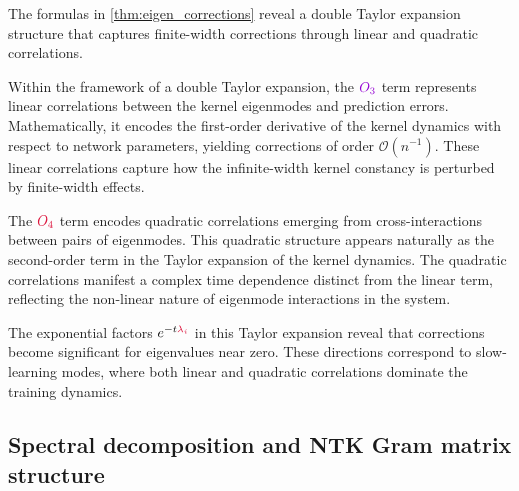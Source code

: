 \documentclass[a4paper]{article}
\theoremstyle{plain}
\theoremstyle{definition}
\theoremstyle{remark}
\begin{document}
\begin{tcolorbox}[colback=green!10,colframe=green!60!black,title={\textbf{Remark: Interpretation of the corrections}},enhanced,drop shadow]
The formulas in \ref{thm:eigen_corrections} reveal a double Taylor expansion structure that captures finite-width corrections through linear and quadratic correlations.

Within the framework of a double Taylor expansion, the $\textcolor{k3color}{O_3}$ term represents linear correlations between the kernel eigenmodes and prediction errors. Mathematically, it encodes the first-order derivative of the kernel dynamics with respect to network parameters, yielding corrections of order $\mathcal{O}(n^{-1})$. These linear correlations capture how the infinite-width kernel constancy is perturbed by finite-width effects.

The $\textcolor{kernelcolor}{O_4}$ term encodes quadratic correlations emerging from cross-interactions between pairs of eigenmodes. This quadratic structure appears naturally as the second-order term in the Taylor expansion of the kernel dynamics. The quadratic correlations manifest a complex time dependence distinct from the linear term, reflecting the non-linear nature of eigenmode interactions in the system.

The exponential factors $e^{-t\textcolor{kernelcolor}{\lambda_i}}$ in this Taylor expansion reveal that corrections become significant for eigenvalues near zero. These directions correspond to slow-learning modes, where both linear and quadratic correlations dominate the training dynamics.
\end{tcolorbox}




\subsection{Spectral decomposition and NTK Gram matrix structure}
\end{document}
